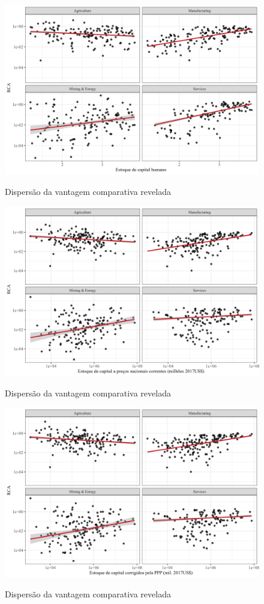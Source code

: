 \begin{figure}[!h]
    \centering
    \caption{Dispersão da vantagem comparativa revelada}
    \includegraphics*[width = 0.8\linewidth]{../plots/rca_hc.png}
    \label{fig:hc}
\end{figure}


\begin{figure}[!h]
    \centering
    \caption{Dispersão da vantagem comparativa revelada}
    \includegraphics*[width = 0.8\linewidth]{../plots/rca_k_constant.png}
    \label{fig:kc}
\end{figure}

\begin{figure}[!h]
    \centering
    \caption{Dispersão da vantagem comparativa revelada}
    \includegraphics*[width = 0.8\linewidth]{../plots/rca_k_ppp.png}
    \label{fig:kppp}
\end{figure}

